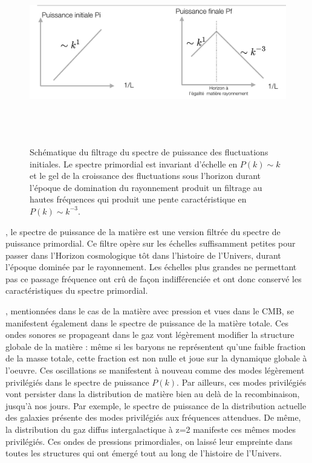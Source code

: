 \begin{figure}[htbp]
	\centering
		\includegraphics[height=8cm]{figs/pk.png}
		\caption{Schématique du filtrage du spectre de puissance des fluctuations initiales. Le spectre primordial est invariant d'échelle en $P(k)\sim k$ et le gel de la croissance des fluctuations sous l'horizon durant l'époque de domination du rayonnement produit un filtrage au hautes fréquences qui produit une pente caractéristique en $P(k)\sim k^{-3}$.}
	\label{f:pk}
\end{figure}

, le spectre de puissance de la matière est une version filtrée du spectre de puissance primordial. Ce filtre opère sur les échelles suffisamment petites pour passer dans l'Horizon cosmologique tôt dans l'histoire de l'Univers, durant l'époque dominée par le rayonnement. Les échelles plus grandes ne permettant pas ce passage fréquence ont crû de façon indifférenciée et ont donc conservé les caractéristiques du spectre primordial.

, mentionnées dans le cas de la matière avec pression et vues dans le CMB, se manifestent également dans le spectre de puissance de la matière totale. Ces ondes sonores se propageant dans le gaz vont légèrement modifier la structure globale de la matière : même si les baryons ne représentent qu'une faible fraction de la masse totale, cette fraction est non nulle et joue sur la dynamique globale à l'oeuvre. Ces oscillations se manifestent à nouveau comme des modes légèrement privilégiés dans le spectre de puissance $P(k)$. Par ailleurs, ces modes privilégiés vont persister dans la distribution de matière bien au delà de la recombinaison, jusqu'à nos jours. Par exemple, le spectre de puissance de la distribution actuelle des galaxies  présente des modes privilégiés aux fréquences attendues. De même, la distribution du gaz diffus intergalactique à z=2 manifeste ces mêmes modes privilégiés. Ces ondes de pressions primordiales, on laissé leur empreinte dans toutes les structures qui ont émergé tout au long de l'histoire de l'Univers.


